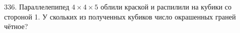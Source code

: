 336. Параллелепипед $4\times4\times5$ облили краской и распилили на кубики со стороной 1. У скольких из полученных кубиков число окрашенных граней чётное?\\
